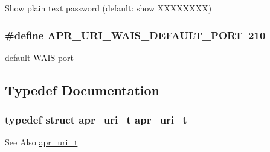 Show plain text password (default\-: show X\-X\-X\-X\-X\-X\-X\-X) \hypertarget{group___a_p_r___util___u_r_i_ga0807570c6ef5c3813f65915fb0c19ff2}{
\subsubsection[{A\-P\-R\-\_\-\-U\-R\-I\-\_\-\-W\-A\-I\-S\-\_\-\-D\-E\-F\-A\-U\-L\-T\-\_\-\-P\-O\-R\-T}]{\setlength{\rightskip}{0pt plus 5cm}\#define A\-P\-R\-\_\-\-U\-R\-I\-\_\-\-W\-A\-I\-S\-\_\-\-D\-E\-F\-A\-U\-L\-T\-\_\-\-P\-O\-R\-T~210}}\label{group___a_p_r___util___u_r_i_ga0807570c6ef5c3813f65915fb0c19ff2}
default W\-A\-I\-S port 

\subsection{Typedef Documentation}
\hypertarget{group___a_p_r___util___u_r_i_ga44e5978712bd6ff4fb65314346c01392}{
\subsubsection[{apr\-\_\-uri\-\_\-t}]{\setlength{\rightskip}{0pt plus 5cm}typedef struct {\bf apr\-\_\-uri\-\_\-t} {\bf apr\-\_\-uri\-\_\-t}}}\label{group___a_p_r___util___u_r_i_ga44e5978712bd6ff4fb65314346c01392}
\begin{DoxySeeAlso}{See Also}
\hyperlink{structapr__uri__t}{apr\-\_\-uri\-\_\-t} 
\end{DoxySeeAlso}


